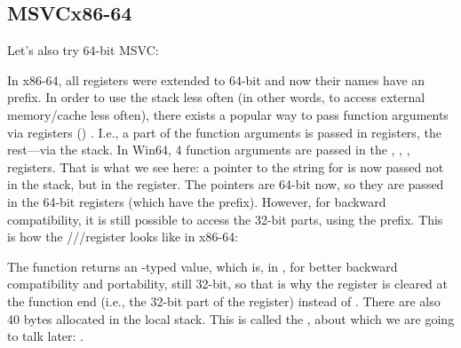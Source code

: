 \subsection{MSVC\EMDASH{}x86-64}

Let's also try 64-bit MSVC:




In x86-64, all registers were extended to 64-bit and now their names have an  prefix.
In order to use the stack less often (in other words, to access external memory/cache less often), there exists
a popular way to pass function arguments via registers () .
I.e., a part of the function arguments is passed in registers, the rest---via the stack.
In Win64, 4 function arguments are passed in the \RCX, \RDX, ,  registers.
That is what we see here: a pointer to the string for \printf is now passed not in the stack, but in the \RCX register.
The pointers are 64-bit now, so they are passed in the 64-bit registers (which have the  prefix).
However, for backward compatibility, it is still possible to access the 32-bit parts, using the  prefix.
This is how the \RAX/\EAX/\AX/\AL register looks like in x86-64:


The \main function returns an \Tint{}-typed value, which is, in \CCpp, for better backward compatibility
and portability, still 32-bit, so that is why the \EAX register is cleared at the function end (i.e., the 32-bit
part of the register) instead of \RAX{}.
There are also 40 bytes allocated in the local stack.
This is called the , about which we are going to talk later: .
